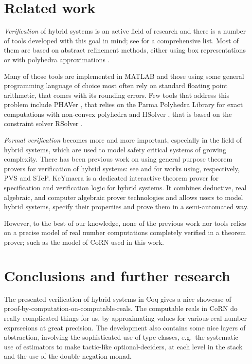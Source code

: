 \documentclass[runningheads]{llncs}
\begin{document}
\section{Related work}

\emph{Verification} of hybrid systems is an active field of research and
there is a number of tools developed with this goal in mind;
see \cite{HST} for a comprehensive list.
Most of them are based on abstract refinement methods, either
using box representations \cite{Kow96,Kow98}
or with polyhedra approximations \cite{alur,Chu99,Cla03}.

Many of those tools are implemented in MATLAB \cite{MATLAB}
and those using some general programming language of choice
most often rely on standard floating point arithmetic, that
comes with its rounding errors. Few tools that address 
this problem include 
PHAVer \cite{PhaVER}, that relies on the Parma Polyhedra Library \cite{Parma} 
for exact computations with non-convex polyhedra 
and 
HSolver \cite{HSolver}, that is based on the constraint solver 
RSolver \cite{RSolver}.

\emph{Formal verification} becomes more and more important, especially in the
field of hybrid systems, which are used to model safety critical systems 
of growing complexity. There has been previous work on using general purpose 
theorem provers for verification of hybrid systems: see \cite{Mum01,Hen98} 
and \cite{Man98,Man01} for works using, respectively, PVS and STeP. 
KeYmaera \cite{KeYmaera} is a dedicated interactive theorem prover for 
specification and verification logic for hybrid systems. It combines
deductive, real algebraic, and computer algebraic prover technologies
and allows users to model hybrid systems, specify their properties
and prove them in a semi-automated way.

However, to the best of our knowledge, none of the previous work nor tools 
relies on a precise model of real number computations completely verified 
in a theorem prover; such as the model of CoRN used in this work.

\section{Conclusions and further research}
\label{conclusions}
The presented verification of hybrid systems in Coq gives a nice
showcase of proof-by-computation-on-computable-reals. The computable
reals in CoRN do really complicated things for us, by approximating
values for various real number exprseeions at great precision. The
development also contains some nice layers of abstraction, involving
the sophisticated use of type classes, e.g.\ the systematic use of
estimators to make tactic-like optional-deciders, at each level in the
stack and the use of the double negation monad.
\end{document}
